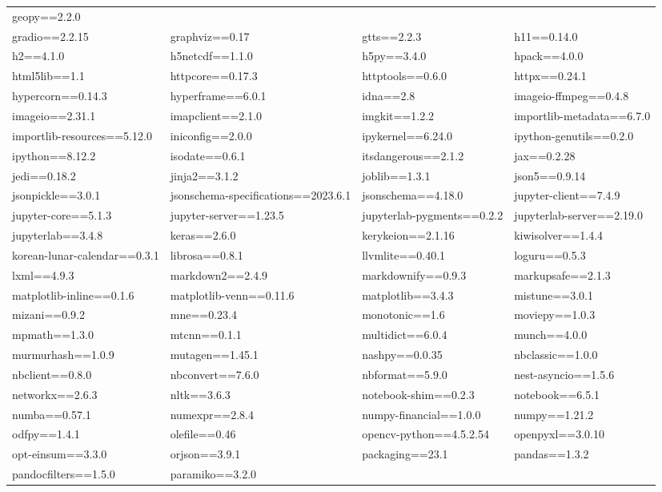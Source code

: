 \begin{tabular}{l l l l}
geopy==2.2.0 \\ gradio==2.2.15 & graphviz==0.17 & gtts==2.2.3 & h11==0.14.0 \\ h2==4.1.0 & h5netcdf==1.1.0 & 
h5py==3.4.0 & hpack==4.0.0 \\ html5lib==1.1 & httpcore==0.17.3 & httptools==0.6.0 & httpx==0.24.1 \\ hypercorn==0.14.3 & 
hyperframe==6.0.1 & idna==2.8 & imageio-ffmpeg==0.4.8 \\ imageio==2.31.1 & imapclient==2.1.0 & imgkit==1.2.2 & importlib-metadata==6.7.0 \\ 
importlib-resources==5.12.0 & iniconfig==2.0.0 & ipykernel==6.24.0 & ipython-genutils==0.2.0 \\ ipython==8.12.2 & isodate==0.6.1 & itsdangerous==2.1.2 & 
jax==0.2.28 \\ jedi==0.18.2 & jinja2==3.1.2 & joblib==1.3.1 & json5==0.9.14 \\ jsonpickle==3.0.1 & jsonschema-specifications==2023.6.1 & 
jsonschema==4.18.0 & jupyter-client==7.4.9 \\ jupyter-core==5.1.3 & jupyter-server==1.23.5 & jupyterlab-pygments==0.2.2 & jupyterlab-server==2.19.0 \\ jupyterlab==3.4.8 & 
keras==2.6.0 & kerykeion==2.1.16 & kiwisolver==1.4.4 \\ korean-lunar-calendar==0.3.1 & librosa==0.8.1 & llvmlite==0.40.1 & loguru==0.5.3 \\ 
lxml==4.9.3 & markdown2==2.4.9 & markdownify==0.9.3 & markupsafe==2.1.3 \\ matplotlib-inline==0.1.6 & matplotlib-venn==0.11.6 & matplotlib==3.4.3 & 
mistune==3.0.1 \\ mizani==0.9.2 & mne==0.23.4 & monotonic==1.6 & moviepy==1.0.3 \\ mpmath==1.3.0 & mtcnn==0.1.1 & 
multidict==6.0.4 & munch==4.0.0 \\ murmurhash==1.0.9 & mutagen==1.45.1 & nashpy==0.0.35 & nbclassic==1.0.0 \\ nbclient==0.8.0 & 
nbconvert==7.6.0 & nbformat==5.9.0 & nest-asyncio==1.5.6 \\ networkx==2.6.3 & nltk==3.6.3 & notebook-shim==0.2.3 & notebook==6.5.1 \\ 
numba==0.57.1 & numexpr==2.8.4 & numpy-financial==1.0.0 & numpy==1.21.2 \\ odfpy==1.4.1 & olefile==0.46 & opencv-python==4.5.2.54 & 
openpyxl==3.0.10 \\ opt-einsum==3.3.0 & orjson==3.9.1 & packaging==23.1 & pandas==1.3.2 \\ pandocfilters==1.5.0 & paramiko==3.2.0 & 

\end{tabular}
